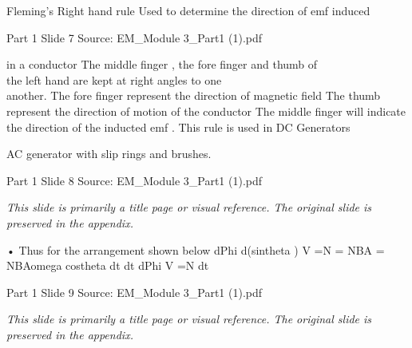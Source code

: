 \documentclass[11pt,a4paper]{article}
\begin{document}
\begin{mdframed}[roundcorner=9pt,backgroundcolor=white,linecolor=anthOrange,linewidth=1pt,innerleftmargin=12pt,innerrightmargin=12pt,innertopmargin=10pt,innerbottommargin=10pt,skipabove=8pt,skipbelow=10pt]
{\HeadingFont\fontsize{15}{18}\selectfont\color{anthDark}Fleming’s Right hand rule Used to determine the direction of emf induced\par}
{\color{anthMid}\small Part 1 \textbullet{} Slide 7 \textbullet{} Source: EM\_Module 3\_Part1 (1).pdf\par}
\vspace{0.5em}
{\small
in a conductor The middle finger , the fore finger and thumb of\\
the left hand are kept at right angles to one\\
another. The fore finger represent the direction of magnetic field The thumb represent the direction of motion of the conductor The middle finger will indicate the direction of the inducted emf . This rule is used in DC Generators\\

}
\end{mdframed}

\begin{mdframed}[roundcorner=9pt,backgroundcolor=white,linecolor=anthBlue,linewidth=1pt,innerleftmargin=12pt,innerrightmargin=12pt,innertopmargin=10pt,innerbottommargin=10pt,skipabove=8pt,skipbelow=10pt]
{\HeadingFont\fontsize{15}{18}\selectfont\color{anthDark}AC generator with slip rings and brushes.\par}
{\color{anthMid}\small Part 1 \textbullet{} Slide 8 \textbullet{} Source: EM\_Module 3\_Part1 (1).pdf\par}
\vspace{0.5em}
{\small
\textit{This slide is primarily a title page or visual reference. The original slide is preserved in the appendix.}

}
\end{mdframed}

\begin{mdframed}[roundcorner=9pt,backgroundcolor=white,linecolor=anthGreen,linewidth=1pt,innerleftmargin=12pt,innerrightmargin=12pt,innertopmargin=10pt,innerbottommargin=10pt,skipabove=8pt,skipbelow=10pt]
{\HeadingFont\fontsize{15}{18}\selectfont\color{anthDark}• Thus for the arrangement shown below dPhi       d(sintheta ) V =N      = NBA          = NBAomega costheta dt         dt dPhi V =N dt\par}
{\color{anthMid}\small Part 1 \textbullet{} Slide 9 \textbullet{} Source: EM\_Module 3\_Part1 (1).pdf\par}
\vspace{0.5em}
{\small
\textit{This slide is primarily a title page or visual reference. The original slide is preserved in the appendix.}

}
\end{mdframed}
\end{document}
